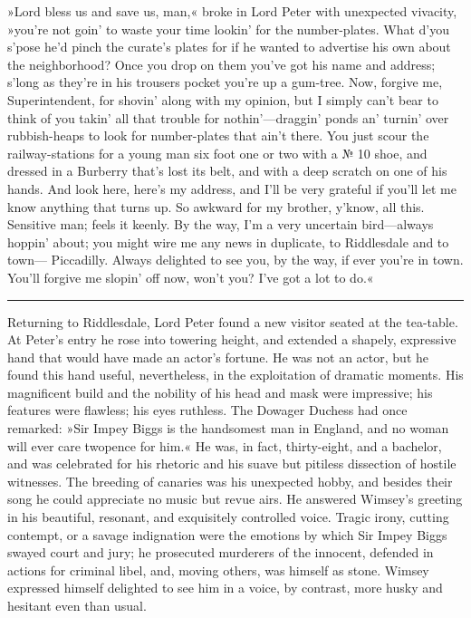 »Lord bless us and save us, man,« broke in Lord Peter with unexpected vivacity, »you're not goin' to waste your time lookin' for the number-plates. What d'you s'pose he'd pinch the curate's plates for if he wanted to advertise his own about the neighborhood? Once you drop on them you've got his name and address; s'long as they're in his trousers pocket you're up a gum-tree. Now, forgive me, Superintendent, for shovin' along with my opinion, but I simply can't bear to think of you takin' all that trouble for nothin'---draggin' ponds an' turnin' over rubbish-heaps to look for number-plates that ain't there. You just scour the railway-stations for a young man six foot one or two with a № 10 shoe, and dressed in a Burberry that's lost its belt, and with a deep scratch on one of his hands. And look here, here's my address, and I'll be very grateful if you'll let me know anything that turns up. So awkward for my brother, y'know, all this. Sensitive man; feels it keenly. By the way, I'm a very uncertain bird\allowbreak---\allowbreak always hoppin' about; you might wire me any news in duplicate, to Riddlesdale and to town\allowbreak--- Piccadilly. Always delighted to see you, by the way, if ever you're in town. You'll forgive me slopin' off now, won't you? I've got a lot to do.«

\noindent\hfil\rule{0.5\textwidth}{.4pt}\hfil

Returning to Riddlesdale, Lord Peter found a new visitor seated at the tea-table. At Peter's entry he rose into towering height, and extended a shapely, expressive hand that would have made an actor's fortune.  He was not an actor, but he found this hand useful, nevertheless, in the exploitation of dramatic moments. His magnificent build and the nobility of his head and mask were impressive; his features were flawless; his eyes ruthless. The Dowager Duchess had once remarked: »Sir Impey Biggs is the handsomest man in England, and no woman will ever care twopence for him.« He was, in fact, thirty-eight, and a bachelor, and was celebrated for his rhetoric and his suave but pitiless dissection of hostile witnesses. The breeding of canaries was his unexpected hobby, and besides their song he could appreciate no music but revue airs. He answered Wimsey's greeting in his beautiful, resonant, and exquisitely controlled voice. Tragic irony, cutting contempt, or a savage indignation were the emotions by which Sir Impey Biggs swayed court and jury; he prosecuted murderers of the innocent, defended in actions for criminal libel, and, moving others, was himself as stone. Wimsey expressed himself delighted to see him in a voice, by contrast, more husky and hesitant even than usual.

